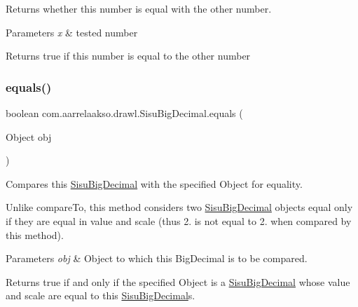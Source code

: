 Returns whether this number is equal with the other number. 


\begin{DoxyParams}{Parameters}
{\em x} & tested number \\
\hline
\end{DoxyParams}
\begin{DoxyReturn}{Returns}
true if this number is equal to the other number 
\end{DoxyReturn}
\mbox{\label{classcom_1_1aarrelaakso_1_1drawl_1_1_sisu_big_decimal_ade8b690f00af26d67a84b812ad694f20}} 
\subsubsection{\texorpdfstring{equals()}{equals()}\hspace{0.1cm}{\footnotesize\ttfamily [3/3]}}
{\footnotesize\ttfamily boolean com.\+aarrelaakso.\+drawl.\+Sisu\+Big\+Decimal.\+equals (\begin{DoxyParamCaption}\item[{Object}]{obj }\end{DoxyParamCaption})}



Compares this \hyperlink{classcom_1_1aarrelaakso_1_1drawl_1_1_sisu_big_decimal}{Sisu\+Big\+Decimal} with the specified Object for equality. 

Unlike compare\+To, this method considers two \hyperlink{classcom_1_1aarrelaakso_1_1drawl_1_1_sisu_big_decimal}{Sisu\+Big\+Decimal} objects equal only if they are equal in value and scale (thus 2. is not equal to 2. when compared by this method).


\begin{DoxyParams}{Parameters}
{\em obj} & Object to which this Big\+Decimal is to be compared. \\
\hline
\end{DoxyParams}
\begin{DoxyReturn}{Returns}
true if and only if the specified Object is a \hyperlink{classcom_1_1aarrelaakso_1_1drawl_1_1_sisu_big_decimal}{Sisu\+Big\+Decimal} whose value and scale are equal to this \hyperlink{classcom_1_1aarrelaakso_1_1drawl_1_1_sisu_big_decimal}{Sisu\+Big\+Decimal}\textquotesingle{}s. 
\end{DoxyReturn}
\mbox{\label{classcom_1_1aarrelaakso_1_1drawl_1_1_sisu_big_decimal_ad797c1167dea95aadaa653ee7f3cbf91}} 
